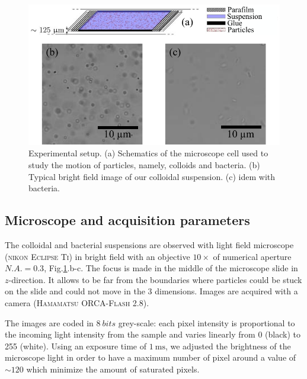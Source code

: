 \documentclass[prb,reprint,amsmath,amssymb]{revtex4-1}
\newcommand{\tg}[1]{{\color{magenta}#1}} %
\begin{document}
\begin{figure}
\includegraphics[width=\linewidth]{Lamelle_Photos.pdf}
\caption{Experimental setup. (a) Schematics of the microscope cell used to study the motion of particles, namely, colloids and bacteria. (b) Typical bright field image of our colloidal suspension. (c) idem with bacteria.}
\label{fig:Slide}
\end{figure}

\subsection{Microscope and acquisition parameters}

The colloidal and bacterial suspensions are observed with light field microscope\cite{Mignard2015} (\textsc{nikon Eclipse Ti}) in \tg{bright field} with an objective $10 \times$ of numerical aperture $N.A. = 0.3$, Fig.\ref{fig:Slide}.b-c. The focus is made in the middle of the microscope slide in $z$-direction. It allows to be far from the boundaries where particles could be stuck on the slide and could not move in the 3 dimensions. Images are acquired with a camera (\textsc{Hamamatsu ORCA-Flash 2.8}).



The images are coded in $\SI{8}{bits}$  grey-scale: each pixel intensity is proportional to the incoming light intensity from the sample and varies linearly from  0 (black) to 255 (white). Using an exposure time of $\SI{1}{\milli\second}$, we adjusted the brightness of the microscope light in order to have a maximum number of pixel around a value of $\sim 120$ which minimize the amount of saturated pixels.
\end{document}
